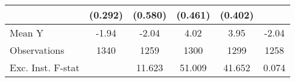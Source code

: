 {\begin{tabular}{l*{5}{c}}
            &     (0.292)         &     (0.580)         &     (0.461)         &     (0.402)         &                     \\
\midrule
Mean Y      &       -1.94         &       -2.04         &        4.02         &        3.95         &       -2.04         \\
Observations&        1340         &        1259         &        1300         &        1299         &        1258         \\
Exc. Inst. F-stat&                     &      11.623         &      51.009         &      41.652         &       0.074         \\
\bottomrule
\end{tabular}
}
